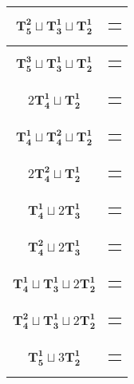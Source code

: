 \documentclass{article}
\begin{document}
\begin{longtable}{|c|c|}
    $\mathbf{T_{5}^{2}} \sqcup \mathbf{T_{3}^{1}} \sqcup \mathbf{T_{2}^{1}}$ & \begin{tabular}{@{}l@{}} $(7,1,8,5,6)\sqcup(10,9,11)\sqcup(0,4)$ \end{tabular} \\ \hline
    $\mathbf{T_{5}^{3}} \sqcup \mathbf{T_{3}^{1}} \sqcup \mathbf{T_{2}^{1}}$ & \begin{tabular}{@{}l@{}} $(6,0,3,4,5)\sqcup(1,8,7)\sqcup(9,11)$ \end{tabular} \\ \hline
    $2\mathbf{T_{4}^{1}} \sqcup \mathbf{T_{2}^{1}}$ & \begin{tabular}{@{}l@{}} $(0,6,1,5)\sqcup(2,9,7,10)\sqcup(3,4)$ \end{tabular} \\ \hline
    $\mathbf{T_{4}^{1}} \sqcup \mathbf{T_{4}^{2}} \sqcup \mathbf{T_{2}^{1}}$ & \begin{tabular}{@{}l@{}} $(11,9,10,7)\sqcup(4,0,5,6)\sqcup(8,1)$ \end{tabular} \\ \hline
    $2\mathbf{T_{4}^{2}} \sqcup \mathbf{T_{2}^{1}}$ & \begin{tabular}{@{}l@{}} $(4,0,5,6)\sqcup(10,9,11,12)\sqcup(8,1)$ \end{tabular} \\ \hline
    $\mathbf{T_{4}^{1}} \sqcup 2\mathbf{T_{3}^{1}}$ & \begin{tabular}{@{}l@{}} $(0,6,1,5)\sqcup(8,10,9)\sqcup(11,4,7)$ \end{tabular} \\ \hline
    $\mathbf{T_{4}^{2}} \sqcup 2\mathbf{T_{3}^{1}}$ & \begin{tabular}{@{}l@{}} $(4,0,5,6)\sqcup(1,8,7)\sqcup(11,9,12)$ \end{tabular} \\ \hline
    $\mathbf{T_{4}^{1}} \sqcup \mathbf{T_{3}^{1}} \sqcup 2\mathbf{T_{2}^{1}}$ & \begin{tabular}{@{}l@{}} $(0,6,1,5)\sqcup(8,10,7)\sqcup(11,4)\sqcup(2,3)$ \end{tabular} \\ \hline
    $\mathbf{T_{4}^{2}} \sqcup \mathbf{T_{3}^{1}} \sqcup 2\mathbf{T_{2}^{1}}$ & \begin{tabular}{@{}l@{}} $(4,0,5,6)\sqcup(11,9,12)\sqcup(2,3)\sqcup(8,1)$ \end{tabular} \\ \hline
    $\mathbf{T_{5}^{1}} \sqcup 3\mathbf{T_{2}^{1}}$ & \begin{tabular}{@{}l@{}} $(0,6,1,5,2)\sqcup(10,3)\sqcup(9,7)\sqcup(11,12)$ \end{tabular} \\ \hline

\end{longtable}
\end{document}
